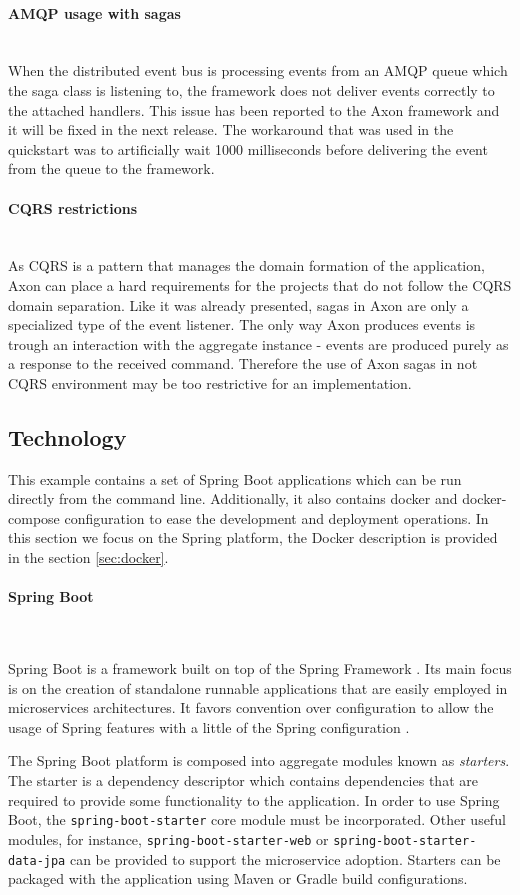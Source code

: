 \documentclass[oneside,
  digital, %
  table,   %
  nolof,     %
  nolot,     %
]{fithesis3}
\newcommand{\newlinepar}[1]{\paragraph{#1}\needspace{4\baselineskip}\mbox{}\\}
\begin{document}
\newlinepar{AMQP usage with sagas}

When the distributed event bus is processing events from an AMQP queue which the saga class is listening to, the framework does not deliver events correctly to the attached handlers. This issue has been reported to the Axon framework and it will be fixed in the next release. The workaround that was used in the quickstart was to artificially wait 1000 milliseconds before delivering the event from the queue to the framework.

\newlinepar{CQRS restrictions}

As CQRS is a pattern that manages the domain formation of the application, Axon can place a hard requirements for the projects that do not follow the CQRS domain separation. Like it was already presented, sagas in Axon are only a specialized type of the event listener. The only way Axon produces events is trough an interaction with the aggregate instance - events are produced purely as a response to the received command. Therefore the use of Axon sagas in not CQRS environment may be too restrictive for an implementation.

\subsection{Technology}

This example contains a set of Spring Boot applications which can be run directly from the command line. Additionally, it also contains docker and docker-compose configuration to ease the development and deployment operations. In this section we focus on the Spring platform, the Docker description is provided in the section \ref{sec:docker}.

\newlinepar{Spring Boot}
\label{sec:spring-boot}

Spring Boot is a framework built on top of the Spring Framework \cite{spring_ms}. Its main focus is on the creation of standalone runnable applications that are easily employed in microservices architectures. It favors convention over configuration to allow the usage of Spring features with a little of the Spring configuration \cite{spring_boot}.

The Spring Boot platform is composed into aggregate modules known as \textit{starters}. The starter is a dependency descriptor which contains dependencies that are required to provide some functionality to the application. In order to use Spring Boot, the \texttt{spring-boot-starter} core module must be incorporated. Other useful modules, for instance, \texttt{spring-boot-starter-web} or \texttt{spring-boot-starter-data-jpa} can be provided to support the microservice adoption. Starters can be packaged with the application using Maven or Gradle build configurations.
\end{document}
